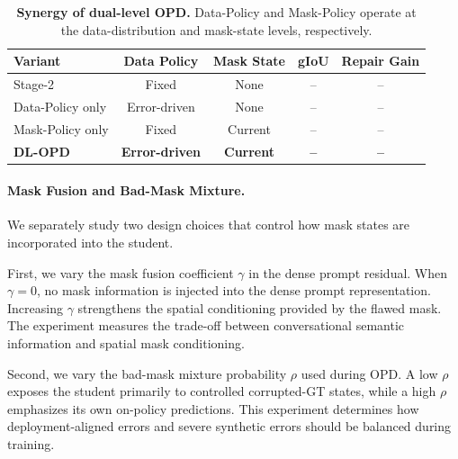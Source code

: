 \begin{table}[t]
    \centering
    \caption{
    \textbf{Synergy of dual-level OPD.}
    Data-Policy and Mask-Policy operate at the data-distribution and mask-state levels, respectively.
    }
    \label{tab:ablation_dual}
    \small
    \setlength{\tabcolsep}{4pt}
    \begin{tabular}{lcccc}
        \toprule
        \textbf{Variant}
        & Data Policy
        & Mask State
        & gIoU
        & Repair Gain \\
        \midrule
        Stage-2
        & Fixed
        & None
        & --
        & -- \\

        Data-Policy only
        & Error-driven
        & None
        & --
        & -- \\

        Mask-Policy only
        & Fixed
        & Current
        & --
        & -- \\

        \textbf{DL-OPD}
        & \textbf{Error-driven}
        & \textbf{Current}
        & \textbf{--}
        & \textbf{--} \\
        \bottomrule
    \end{tabular}
\end{table}


\paragraph{Mask Fusion and Bad-Mask Mixture.}
We separately study two design choices that control how mask states are incorporated into the student.

First, we vary the mask fusion coefficient $\gamma$ in the dense prompt residual.
When $\gamma=0$, no mask information is injected into the dense prompt representation.
Increasing $\gamma$ strengthens the spatial conditioning provided by the flawed mask.
The experiment measures the trade-off between conversational semantic information and spatial mask conditioning.

Second, we vary the bad-mask mixture probability $\rho$ used during OPD.
A low $\rho$ exposes the student primarily to controlled corrupted-GT states, while a high $\rho$ emphasizes its own on-policy predictions.
This experiment determines how deployment-aligned errors and severe synthetic errors should be balanced during training.


